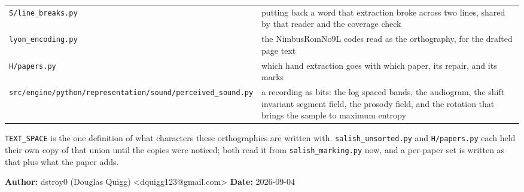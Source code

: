 \begin{longtable}{@{}>{\raggedright\arraybackslash}p{}>{\raggedright\arraybackslash}p{}@{}}
\texttt{S/\allowbreak{}line\_\allowbreak{}breaks.\allowbreak{}py} & putting back a word that extraction broke across two lines, shared by that reader and the coverage check \\
\texttt{lyon\_\allowbreak{}encoding.\allowbreak{}py} & the NimbusRomNo9L codes read as the orthography, for the drafted page text \\
\texttt{H/\allowbreak{}papers.\allowbreak{}py} & which hand extraction goes with which paper, its repair, and its marks \\
\texttt{src/\allowbreak{}engine/\allowbreak{}python/\allowbreak{}representation/\allowbreak{}sound/\allowbreak{}perceived\_\allowbreak{}sound.\allowbreak{}py} & a recording as bits: the log spaced bands, the audiogram, the shift invariant segment field, the prosody field, and the rotation that brings the sample to maximum entropy \\
\bottomrule
\end{longtable}
\normalsize

\texttt{TEXT\_\allowbreak{}SPACE} is the one definition of what characters these orthographies are written with. \texttt{salish\_\allowbreak{}unsorted.\allowbreak{}py} and \texttt{H/\allowbreak{}papers.\allowbreak{}py} each held their own copy of that union until the copies were noticed; both read it from \texttt{salish\_\allowbreak{}marking.\allowbreak{}py} now, and a per-paper set is written as that plus what the paper adds.

\textbf{Author:} dstroy0 (Douglas Quigg) <dquigg123@gmail.com> \textbf{Date:} 2026-09-04

